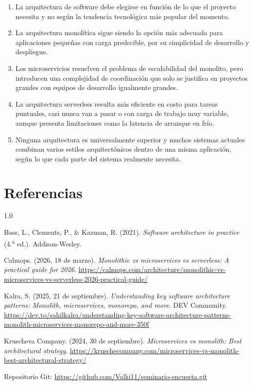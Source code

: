 \documentclass[12pt,letterpaper]{article}
\begin{document}
\begin{enumerate}[label=\arabic*., leftmargin=*]
\item La arquitectura de software debe elegirse en función de lo que el proyecto necesita y no según la tendencia tecnológica más popular del momento.
\item La arquitectura monolítica sigue siendo la opción más adecuada para aplicaciones pequeñas con carga predecible, por su simplicidad de desarrollo y despliegue.
\item Los microservicios resuelven el problema de escalabilidad del monolito, pero introducen una complejidad de coordinación que solo se justifica en proyectos grandes con equipos de desarrollo igualmente grandes.
\item La arquitectura serverless resulta más eficiente en costo para tareas puntuales, casi nunca van a pasar o con carga de trabajo muy variable, aunque presenta limitaciones como la latencia de arranque en frío.
\item Ninguna arquitectura es universalmente superior y muchos sistemas actuales combinan varios estilos arquitectónicos dentro de una misma aplicación, según lo que cada parte del sistema realmente necesita.
\end{enumerate}

\section*{Referencias}

\begin{spacing}{1.0}
\small
\setlength{\parindent}{-1.27cm}
\setlength{\leftskip}{1.27cm}

Bass, L., Clements, P., \& Kazman, R. (2021). \textit{Software architecture in practice} (4.\textsuperscript{a} ed.). Addison-Wesley.

Calmops. (2026, 18 de marzo). \textit{Monolithic vs microservices vs serverless: A practical guide for 2026}. \url{https://calmops.com/architecture/monolithic-vs-microservices-vs-serverless-2026-practical-guide/}

Kalra, S. (2025, 21 de septiembre). \textit{Understanding key software architecture patterns: Monolith, microservices, monorepo, and more}. DEV Community. \url{https://dev.to/sahilkalra/understanding-key-software-architecture-patterns-monolith-microservices-monorepo-and-more-350f}

Kruscheva Company. (2024, 30 de septiembre). \textit{Microservices vs monolith: Best architectural strategy}. \url{https://kruschecompany.com/microservices-vs-monolith-best-architectural-strategy/}

\end{spacing}

\vspace{12pt}
\noindent\small Repositorio Git: \url{https://github.com/Valki11/seminario-encuesta.git}
\end{document}
